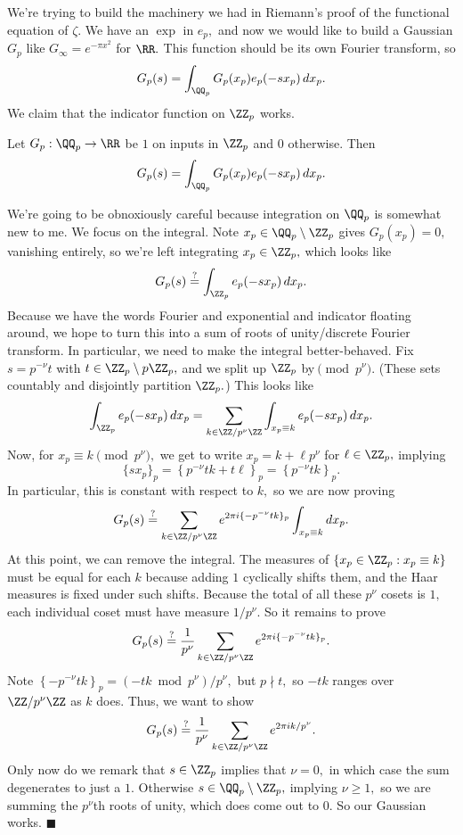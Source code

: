 We're trying to build the machinery we had in Riemann's proof of the functional equation of $\zeta.$ We have an $\exp$ in $e_p,$ and now we would like to build a Gaussian $G_p$ like $G_\infty=e^{-\pi x^2}$ for $\RR.$ This function should be its own Fourier transform, so
\[G_p(s)=\int_{\QQ_p}G_p(x_p)e_p(-sx_p)\,dx_p.\]
We claim that the indicator function on $\ZZ_p$ works.
\begin{proposition}
    Let $G_p:\QQ_p\to\RR$ be $1$ on inputs in $\ZZ_p$ and $0$ otherwise. Then
    \[G_p(s)=\int_{\QQ_p}G_p(x_p)e_p(-sx_p)\,dx_p.\]
\end{proposition}
We're going to be obnoxiously careful because integration on $\QQ_p$ is somewhat new to me. We focus on the integral. Note $x_p\in\QQ_p\setminus\ZZ_p$ gives $G_p(x_p)=0,$ vanishing entirely, so we're left integrating $x_p\in\ZZ_p,$ which looks like
\[G_p(s)\stackrel?=\int_{\ZZ_p}e_p(-sx_p)\,dx_p.\]
Because we have the words Fourier and exponential and indicator floating around, we hope to turn this into a sum of roots of unity/discrete Fourier transform. In particular, we need to make the integral better-behaved. Fix $s=p^{-\nu}t$ with $t\in\ZZ_p\setminus p\ZZ_p,$ and we split up $\ZZ_p$ by$\pmod{p^\nu}.$ (These sets countably and disjointly partition $\ZZ_p.$) This looks like
\[\int_{\ZZ_p}e_p(-sx_p)\,dx_p=\sum_{k\in\ZZ/p^\nu\ZZ}\int_{x_p\equiv k}e_p(-sx_p)\,dx_p.\]
Now, for $x_p\equiv k\pmod{p^\nu},$ we get to write $x_p=k+\ell p^\nu$ for $\ell\in\ZZ_p,$ implying
\[\{sx_p\}_p=\left\{p^{-\nu}tk+t\ell\right\}_p=\left\{p^{-\nu}tk\right\}_p.\]
In particular, this is constant with respect to $k,$ so we are now proving
\[G_p(s)\stackrel?=\sum_{k\in\ZZ/p^\nu\ZZ}e^{2\pi i\{-p^{-\nu}tk\}_p}\int_{x_p\equiv k}dx_p.\]
At this point, we can remove the integral. The measures of $\{x_p\in\ZZ_p:x_p\equiv k\}$ must be equal for each $k$ because adding $1$ cyclically shifts them, and the Haar measures is fixed under such shifts. Because the total of all these $p^\nu$ cosets is $1,$ each individual coset must have measure $1/p^\nu.$ So it remains to prove
\[G_p(s)\stackrel?=\frac1{p^\nu}\sum_{k\in\ZZ/p^\nu\ZZ}e^{2\pi i\{-p^{-\nu}tk\}_p}.\]
Note $\left\{-p^{-\nu}tk\right\}_p=(-tk\bmod{p^\nu})/p^\nu,$ but $p\nmid t,$ so $-tk$ ranges over $\ZZ/p^\nu\ZZ$ as $k$ does. Thus, we want to show
\[G_p(s)\stackrel?=\frac1{p^\nu}\sum_{k\in\ZZ/p^\nu\ZZ}e^{2\pi ik/p^\nu}.\]
Only now do we remark that $s\in\ZZ_p$ implies that $\nu=0,$ in which case the sum degenerates to just a $1.$ Otherwise $s\in\QQ_p\setminus\ZZ_p,$ implying $\nu\ge1,$ so we are summing the $p^\nu$th roots of unity, which does come out to $0.$ So our Gaussian works. $\blacksquare$

